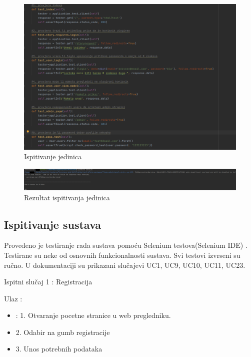 			\begin{figure}[H]
				\includegraphics[width=1\linewidth]{slike/unit_tests.PNG} %
				\caption{Ispitivanje jedinica}
				\label{fig:unit1} %
			\end{figure}
		
			\begin{figure}[H]
				\includegraphics[width=1\linewidth]{slike/unit_test_result.PNG} %
				\caption{Rezultat ispitivanja jedinica}
				\label{fig:unit2} %
			\end{figure}
			
			
			\subsection{Ispitivanje sustava}
			
			 \noindent Provedeno je testiranje rada sustava pomoću Selenium testova(Selenium IDE)
			 . Testirane su neke od osnovnih funkcionalnosti sustava. Svi testovi izvrseni su ručno. U dokumentaciji su prikazani slučajevi UC1, UC9, UC10, UC11, UC23.

			\noindent Ispitni slučaj 1 : Registracija

			\noindent Ulaz : 
	
			\begin{itemize}
				\item : 1. Otvaranje pocetne stranice u web pregledniku.
				\item   2. Odabir na gumb registracije
				\item   3. Unos potrebnih podataka
			\end{itemize}

